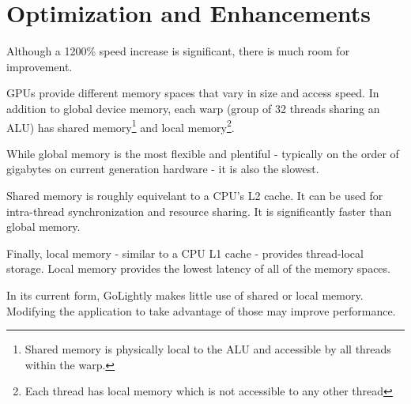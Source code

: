 \section{Optimization and Enhancements}

Although a 1200\% speed increase is significant, there is much room for improvement. 

GPUs provide different memory spaces that vary in size and access speed. In addition to global device memory, each warp (group of 32 threads sharing an ALU) has shared memory\footnote{Shared memory is physically local to the ALU and accessible by all threads within the warp.} and local memory\footnote{Each thread has local memory which is not accessible to any other thread}.

While global memory is the most flexible and plentiful - typically on the order of gigabytes on current generation hardware - it is also the slowest. 

Shared memory is roughly equivelant to a CPU's L2 cache. It can be used for intra-thread synchronization and resource sharing. It is significantly faster than global memory.

Finally, local memory - similar to a CPU L1 cache - provides thread-local storage. Local memory provides the lowest latency of all of the memory spaces.

In its current form, GoLightly makes little use of shared or local memory. Modifying the application to take advantage of those may improve performance.







